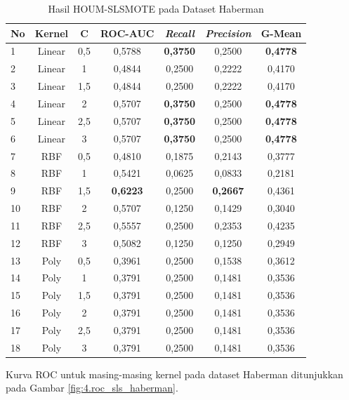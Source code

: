 \begin{table}[H]
\centering
\caption{Hasil HOUM-SLSMOTE pada Dataset Haberman}
\label{table:4.sls_haberman}
\footnotesize
\begin{tabular}{|l|c|c|c|c|c|c|}
\hline
\textbf{No} & \textbf{Kernel} & \textbf{C} & \textbf{ROC-AUC} & \textbf{\textit{Recall}} & \textbf{\textit{Precision}} & \textbf{G-Mean} \\
\hline
1 & Linear & 0,5 & 0,5788 & \textbf{0,3750} & 0,2500 & \textbf{0,4778} \\
\hline
2 & Linear & 1 & 0,4844 & 0,2500 & 0,2222 & 0,4170 \\
\hline
3 & Linear & 1,5 & 0,4844 & 0,2500 & 0,2222 & 0,4170 \\
\hline
4 & Linear & 2 & 0,5707 & \textbf{0,3750} & 0,2500 & \textbf{0,4778} \\
\hline
5 & Linear & 2,5 & 0,5707 & \textbf{0,3750} & 0,2500 & \textbf{0,4778} \\
\hline
6 & Linear & 3 & 0,5707 & \textbf{0,3750} & 0,2500 & \textbf{0,4778} \\
\hline
7 & RBF & 0,5 & 0,4810 & 0,1875 & 0,2143 & 0,3777 \\
\hline
8 & RBF & 1 & 0,5421 & 0,0625 & 0,0833 & 0,2181 \\
\hline
9 & RBF & 1,5 & \textbf{0,6223} & 0,2500 & \textbf{0,2667} & 0,4361 \\
\hline
10 & RBF & 2 & 0,5707 & 0,1250 & 0,1429 & 0,3040 \\
\hline
11 & RBF & 2,5 & 0,5557 & 0,2500 & 0,2353 & 0,4235 \\
\hline
12 & RBF & 3 & 0,5082 & 0,1250 & 0,1250 & 0,2949 \\
\hline
13 & Poly & 0,5 & 0,3961 & 0,2500 & 0,1538 & 0,3612 \\
\hline
14 & Poly & 1 & 0,3791 & 0,2500 & 0,1481 & 0,3536 \\
\hline
15 & Poly & 1,5 & 0,3791 & 0,2500 & 0,1481 & 0,3536 \\
\hline
16 & Poly & 2 & 0,3791 & 0,2500 & 0,1481 & 0,3536 \\
\hline
17 & Poly & 2,5 & 0,3791 & 0,2500 & 0,1481 & 0,3536 \\
\hline
18 & Poly & 3 & 0,3791 & 0,2500 & 0,1481 & 0,3536 \\
\hline
\end{tabular}
\end{table}

Kurva ROC untuk masing-masing kernel pada dataset Haberman ditunjukkan pada Gambar \ref{fig:4.roc_sls_haberman}.

